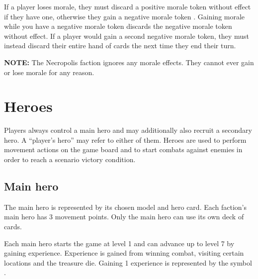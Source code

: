 \documentclass[12pt]{article}
\def\assets{assets}
\def\svgs{\assets/svgs}
\begin{document}
If a player loses morale, they must discard a positive morale token  without effect if they have one, otherwise they gain a negative morale token . Gaining morale while you have a negative morale token discards the negative morale token without effect. If a player would gain a second negative morale token, they must instead discard their entire hand of cards the next time they end their turn.\par
\textbf{NOTE:} The Necropolis faction ignores any morale effects. They cannot ever gain or lose morale for any reason.\\[12pt]


\clearpage

\section[Heroes]{Heroes\hypertarget{Heroes}{}}
Players always control a main hero and may additionally also recruit a secondary hero. A “player’s hero” may refer to either of them. Heroes are used to perform movement actions on the game board and to start combats against enemies in order to reach a scenario victory condition.
\subsection*{Main hero}

The main hero is represented by its chosen model and hero card. Each faction’s main hero has 3 movement points. Only the main hero can use its own deck of cards.\par
Each main hero starts the game at level 1 and can advance up to level 7 by gaining experience. Experience is gained from winning combat, visiting certain locations and the treasure die. Gaining 1 experience is represented by the symbol .
\end{document}
